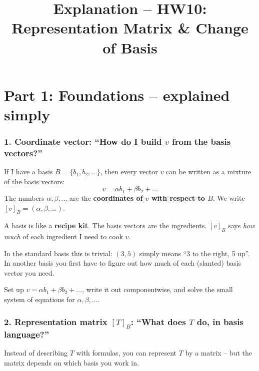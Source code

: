 \documentclass[a4paper,12pt]{article}
\title{Explanation -- HW10: Representation Matrix \& Change of Basis}
\author{}
\date{}
\begin{document}
\maketitle

\part*{Part 1: Foundations -- explained simply}

\section*{1. Coordinate vector: ``How do I build $v$ from the basis vectors?''}

If I have a basis $B = \{b_1, b_2, \dots\}$, then every vector $v$ can be written as a mixture of the basis vectors:
\[
v = \alpha b_1 + \beta b_2 + \dots
\]
The numbers $\alpha, \beta, \dots$ are the \textbf{coordinates of $v$ with respect to $B$}. We write $[v]_B = (\alpha, \beta, \dots)$.

\begin{analogie}
A basis is like a \textbf{recipe kit}. The basis vectors are the ingredients. $[v]_B$ says \emph{how much} of each ingredient I need to cook $v$.

In the standard basis this is trivial: $(3, 5)$ simply means ``3 to the right, 5 up''. In another basis you first have to figure out how much of each (slanted) basis vector you need.
\end{analogie}

\begin{merkbox}[title={How to compute $[v]_B$}]
Set up $v = \alpha b_1 + \beta b_2 + \dots$, write it out componentwise, and solve the small system of equations for $\alpha, \beta, \dots$.
\end{merkbox}

\section*{2. Representation matrix $[T]_B$: ``What does $T$ do, in basis language?''}

Instead of describing $T$ with formulas, you can represent $T$ by a matrix -- but the matrix depends on which basis you work in.
\end{document}
